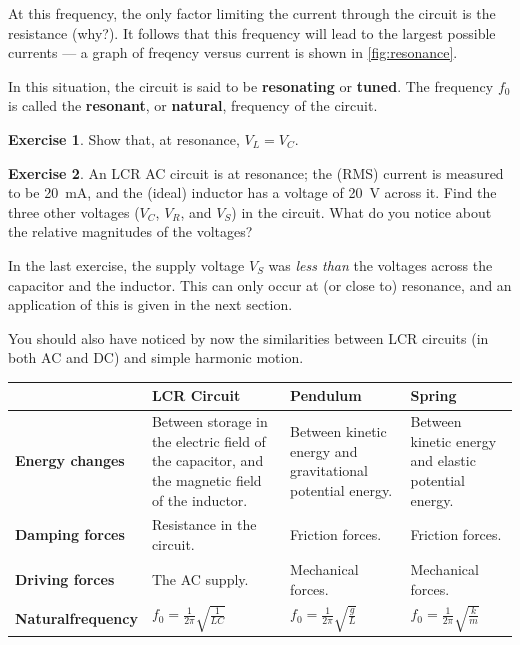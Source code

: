 \documentclass[a4paper]{amsbook}
\theoremstyle{definition}
\newtheorem{exercise}{Exercise}
\numberwithin{exercise}{chapter}
\numberwithin{exercise}{chapter}
\begin{document}
At this frequency, the only factor limiting the current through the circuit is the resistance (why?). It follows
that this frequency will lead to the largest possible currents --- a graph of freqency versus current is shown
in \cref{fig:resonance}.

In this situation, the circuit is said to be \textbf{resonating} or \textbf{tuned}. The frequency $ f_0 $ is called
the \textbf{resonant}, or \textbf{natural}, frequency of the circuit.

\begin{exercise}
  Show that, at resonance, $ V_L = V_C $.
\end{exercise}

\begin{exercise}
  An LCR AC circuit is at resonance; the (RMS) current is measured to be \SI{20}{\milli\ampere}, and the (ideal) inductor
  has a voltage of \SI{20}{\volt} across it. Find the three other voltages ($ V_C $, $ V_R $, and $ V_S $) in the circuit.
  What do you notice about the relative magnitudes of the voltages?
\end{exercise}

In the last exercise, the supply voltage $ V_S $ was \emph{less than} the voltages across the capacitor and the inductor. This
can only occur at (or close to) resonance, and an application of this is given in the next section.

You should also have noticed by now the similarities between LCR circuits (in both AC and DC) and simple harmonic motion.
\begin{center}
  \def\arraystretch{1.5}
  \begin{tabularx}{\textwidth}{|X|X|X|X|}\hline
    & \textbf{LCR Circuit} & \textbf{Pendulum} & \textbf{Spring}\\\hline

    \textbf{Energy changes} & Between storage in the electric field of the capacitor, and the magnetic field of the inductor.
                            & Between kinetic energy and gravitational potential energy.
                            & Between kinetic energy and elastic potential energy.\\\hline
    \textbf{Damping forces} & Resistance in the circuit.
                            & Friction forces.
                            & Friction forces.\\\hline
    \textbf{Driving forces} & The AC supply.
                            & Mechanical forces.
                            & Mechanical forces.\\\hline
    \textbf{Natural\newline frequency} &\rule{0pt}{27pt} $\displaystyle f_0 = \frac{1}{2\pi} \sqrt{\frac{1}{LC}} $
                               & $\displaystyle f_0 = \frac{1}{2\pi} \sqrt{\frac{g}{L}} $
                               & $\displaystyle f_0 = \frac{1}{2\pi} \sqrt{\frac{k}{m}} $\\\hline
  \end{tabularx}
\end{center}
\end{document}
